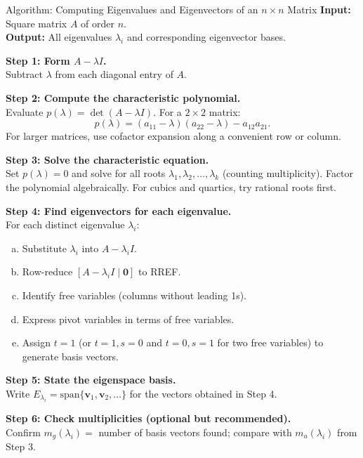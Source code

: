 \documentclass[12pt,a4paper]{article}
\begin{document}
\begin{infobox}{Algorithm: Computing Eigenvalues and Eigenvectors of an $n\times n$ Matrix}
\textbf{Input:} Square matrix $A$ of order $n$.\\
\textbf{Output:} All eigenvalues $\lambda_i$ and corresponding eigenvector bases.

\medskip
\textbf{Step 1: Form $A - \lambda I$.}\\
Subtract $\lambda$ from each diagonal entry of $A$.

\medskip
\textbf{Step 2: Compute the characteristic polynomial.}\\
Evaluate $p(\lambda) = \det(A - \lambda I)$. For a $2\times 2$ matrix:
\[
  p(\lambda) = (a_{11}-\lambda)(a_{22}-\lambda) - a_{12}a_{21}.
\]
For larger matrices, use cofactor expansion along a convenient row or column.

\medskip
\textbf{Step 3: Solve the characteristic equation.}\\
Set $p(\lambda) = 0$ and solve for all roots $\lambda_1, \lambda_2, \ldots, \lambda_k$ (counting multiplicity).
Factor the polynomial algebraically. For cubics and quartics, try rational roots first.

\medskip
\textbf{Step 4: Find eigenvectors for each eigenvalue.}\\
For each distinct eigenvalue $\lambda_i$:
\begin{enumerate}[(a)]
  \item Substitute $\lambda_i$ into $A - \lambda_i I$.
  \item Row-reduce $[A - \lambda_i I \mid \mathbf{0}]$ to RREF.
  \item Identify free variables (columns without leading 1s).
  \item Express pivot variables in terms of free variables.
  \item Assign $t = 1$ (or $t=1, s=0$ and $t=0, s=1$ for two free variables) to generate basis vectors.
\end{enumerate}

\medskip
\textbf{Step 5: State the eigenspace basis.}\\
Write $E_{\lambda_i} = \text{span}\{\mathbf{v}_1, \mathbf{v}_2, \ldots\}$ for the vectors obtained in Step 4.

\medskip
\textbf{Step 6: Check multiplicities (optional but recommended).}\\
Confirm $m_g(\lambda_i) = $ number of basis vectors found; compare with $m_a(\lambda_i)$ from Step 3.
\end{infobox}
\end{document}
